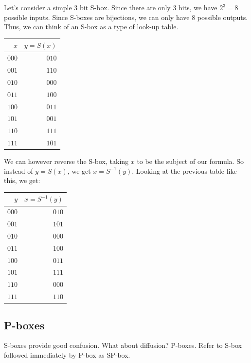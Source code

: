 \begin{example}
Let's consider a simple 3 bit S-box. Since there are only 3 bits, we have 
$2^3 = 8$ possible inputs. Since S-boxes are bijections, we can only have
8 possible outputs. Thus, we can think of an S-box as a type of look-up
table.

\begin{center}
\begin{tabular}{|r|r|}
\hline
$x$ & $y = S(x)$ \\\hline
$000$ & $010$ \\\hline
$001$ & $110$ \\\hline
$010$ & $000$ \\\hline
$011$ & $100$ \\\hline
$100$ & $011$ \\\hline
$101$ & $001$ \\\hline
$110$ & $111$ \\\hline
$111$ & $101$ \\\hline
\end{tabular}
\end{center}

We can however reverse the S-box, taking $x$ to be the subject of our formula.
So instead of $y = S(x)$, we get $x = S^{-1}(y)$. Looking at the previous
table like this, we get:

\begin{center}
\begin{tabular}{|r|r|}
\hline
$y$ & $x = S^{-1}(y)$ \\\hline
$000$ & $010$ \\\hline
$001$ & $101$ \\\hline
$010$ & $000$ \\\hline
$011$ & $100$ \\\hline
$100$ & $011$ \\\hline
$101$ & $111$ \\\hline
$110$ & $000$ \\\hline
$111$ & $110$ \\\hline
\end{tabular}
\end{center}

\end{example}

\subsection{P-boxes}
S-boxes provide good confusion. What about diffusion? P-boxes.
Refer to S-box followed immediately by P-box as SP-box.

